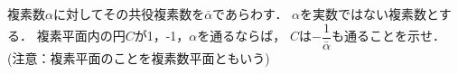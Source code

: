 \documentclass[../../main.tex]{subfiles}
\begin{document}
複素数$\alpha$に対してその共役複素数を$\bar{\alpha}$であらわす．
$\alpha$を実数ではない複素数とする．
複素平面内の円$C$が1，-1，$\alpha$を通るならば，
$C$は$\displaystyle -\dfrac{1}{\bar{\alpha}}$も通ることを示せ．
(注意：複素平面のことを複素数平面ともいう)
\end{document}
